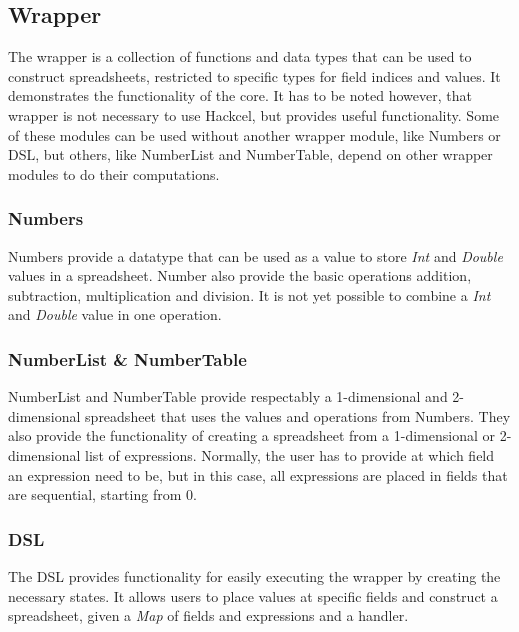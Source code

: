 \documentclass{article}
\begin{document}
	\subsection{Wrapper}
	The wrapper is a collection of functions and data types that can be used to construct spreadsheets, restricted to specific types for field indices and values. It demonstrates the functionality of the core. It has to be noted however, that wrapper is not necessary to use Hackcel, but provides useful functionality. Some of these modules can be used without another wrapper module, like Numbers or DSL, but others, like NumberList and NumberTable, depend on other wrapper modules to do their computations.
	\subsubsection{Numbers}
	Numbers provide a datatype that can be used as a value to store \textit{Int} and \textit{Double} values in a spreadsheet. Number also provide the basic operations addition, subtraction, multiplication and division. It is not yet possible to combine a \textit{Int} and \textit{Double} value in one operation.
	\subsubsection{NumberList \& NumberTable}	
	NumberList and NumberTable provide respectably a 1-dimensional and 2-dimensional spreadsheet that uses the values and operations from Numbers. They also provide the functionality of creating a spreadsheet from a 1-dimensional or 2-dimensional list of expressions. Normally, the user has to provide at which field an expression need to be, but in this case, all expressions are placed in fields that are sequential, starting from 0.
\subsubsection{DSL}
	The DSL provides functionality for easily executing the wrapper by creating the necessary states. It allows users to place values at specific fields and construct a spreadsheet, given a \textit{Map} of fields and expressions and a handler.
	
\end{document}
